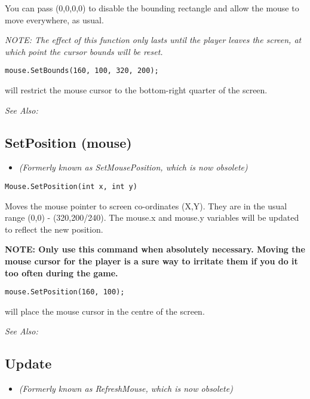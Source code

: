 You can pass (0,0,0,0) to disable the bounding rectangle and allow the mouse to move
everywhere, as usual.

\it{NOTE:} The effect of this function only lasts until the player leaves the screen,
at which point the cursor bounds will be reset.

\begin{verbatim}
mouse.SetBounds(160, 100, 320, 200);
\end{verbatim}
will restrict the mouse cursor to the bottom-right quarter of the screen.

\it{See Also:} 


\subsection{SetPosition (mouse)}\label{Mouse.SetPosition}%

\begin{itemize}
\item \it{(Formerly known as SetMousePosition, which is now obsolete)}
\end{itemize}

\begin{verbatim}
Mouse.SetPosition(int x, int y)
\end{verbatim}

Moves the mouse pointer to screen co-ordinates (X,Y). They are
in the usual range (0,0) - (320,200/240). The mouse.x and mouse.y variables will be
updated to reflect the new position.

\bf{NOTE:} Only use this command when absolutely necessary. Moving the mouse cursor
for the player is a sure way to irritate them if you do it too often during the game.

\begin{verbatim}
mouse.SetPosition(160, 100);
\end{verbatim}
will place the mouse cursor in the centre of the screen.

\it{See Also:} 


\subsection{Update}\label{Mouse.Update}%

\begin{itemize}
\item \it{(Formerly known as RefreshMouse, which is now obsolete)}
\end{itemize}

